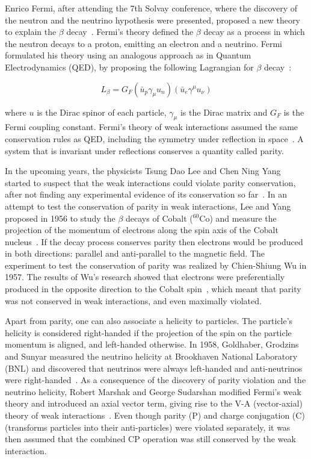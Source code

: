 Enrico Fermi, after attending the 7th Solvay conference, where the discovery of the neutron and the neutrino hypothesis were presented, proposed a new theory to explain the $\beta$ decay~\cite{FermiWeakTheory_1}. Fermi's theory defined the $\beta$ decay as a process in which the neutron decays to a proton, emitting an electron and a neutrino. Fermi formulated his theory using an analogous approach as in Quantum Electrodynamics (QED), by proposing the following Lagrangian for $\beta$ decay~\cite{FermiWeakTheory_2}:

\begin{equation}
L_{\beta}=G_{F}\left(\bar{u}_{p}\gamma_{\mu}u_{n}\right)\left(\bar{u}_{e}\gamma^{\mu}u_{\nu}\right)
\end{equation}

where $u$ is the Dirac spinor of each particle, $\gamma_{\mu}$ is the Dirac matrix and $G_{F}$ is the Fermi coupling constant. Fermi's theory of weak interactions assumed the same conservation rules as QED, including the symmetry under reflection in space~\cite{FermiWeakTheory_2}. A system that is invariant under reflections conserves a quantity called parity.

In the upcoming years, the physicists Tsung Dao Lee and Chen Ning Yang started to suspect that the weak interactions could violate parity conservation, after not finding any experimental evidence of its conservation so far~\cite{LeeYang}. In an attempt to test the conservation of parity in weak interactions, Lee and Yang proposed in 1956 to study the $\beta$ decays of Cobalt (${}^{60}$Co) and measure the projection of the momentum of electrons along the spin axis of the Cobalt nucleus~\cite{LeeYang}. If the decay process conserves parity then electrons would be produced in both directions: parallel and anti-parallel to the magnetic field. The experiment to test the conservation of parity was realized by Chien-Shiung Wu in 1957. The results of Wu's research showed that electrons were preferentially produced in the opposite direction to the Cobalt spin~\cite{WuParityViolation}, which meant that parity was not conserved in weak interactions, and even maximally violated.

Apart from parity, one can also associate a helicity to particles. The particle's helicity is considered right-handed if the projection of the spin on the particle momentum is aligned, and left-handed otherwise. In 1958, Goldhaber, Grodzins and Sunyar measured the neutrino helicity at Brookhaven National Laboratory (BNL) and discovered that neutrinos were always left-handed and anti-neutrinos were right-handed~\cite{NeutrinoHelicity}. As a consequence of the discovery of parity violation and the neutrino helicity, Robert Marshak and George Sudarshan modified Fermi's weak theory and introduced an axial vector term, giving rise to the V-A (vector-axial) theory of weak interactions~\cite{VATheory}. Even though parity (P) and charge conjugation (C) (transforms particles into their anti-particles) were violated separately, it was then assumed that the combined CP operation was still conserved by the weak interaction.

